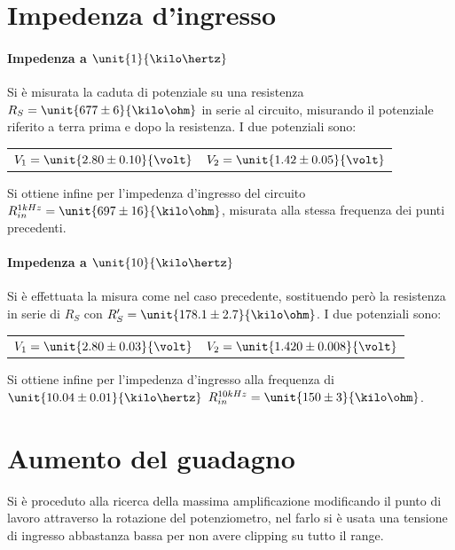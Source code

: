 \documentclass[10pt,a4paper]{article}
\begin{document}
\section{Impedenza d'ingresso}

\paragraph{Impedenza a $\unit{1}{\kilo\hertz}$} Si è misurata la caduta di potenziale su una resistenza $R_S = \unit{677 \pm 6}{\kilo\ohm}$ in serie al circuito, misurando il potenziale riferito a terra prima e dopo la resistenza.
I due potenziali sono:
\begin{table}[h!]
	\centering
	\begin{tabular}{cc}
		$V_1 = \unit{2.80 \pm 0.10}{\volt}$  & $V_2 = \unit{1.42 \pm 0.05}{\volt}$
	\end{tabular}
\end{table}

Si ottiene infine per l'impedenza d'ingresso del circuito $R_{in}^{1kHz} = \unit{697 \pm 16}{\kilo\ohm}$, misurata alla stessa frequenza dei punti precedenti.

\paragraph{Impedenza a $\unit{10}{\kilo\hertz}$}  Si è effettuata la misura come nel caso precedente, sostituendo però la resistenza in serie di $R_S$ con $R_S' = \unit{178.1 \pm 2.7}{\kilo\ohm}$.
I due potenziali sono:
\begin{table}[h!]
	\centering
	\begin{tabular}{cc}
		$V_1 = \unit{2.80 \pm 0.03}{\volt}$  & $V_2 = \unit{1.420 \pm 0.008}{\volt}$
	\end{tabular}
\end{table}

Si ottiene infine per l'impedenza d'ingresso alla frequenza di $\unit{10.04 \pm 0.01}{\kilo\hertz}$ $R_{in}^{10kHz} = \unit{150 \pm 3}{\kilo\ohm}$.

\section{Aumento del guadagno}

Si è proceduto alla ricerca della massima amplificazione modificando il punto di lavoro attraverso la rotazione del potenziometro, nel farlo si è usata una tensione di ingresso abbastanza bassa per non avere clipping su tutto il range.
\end{document}
